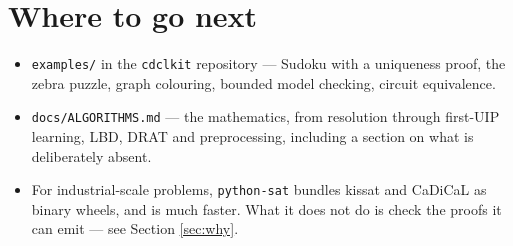 \documentclass[11pt,a4paper]{article}
\newcommand{\pkg}[1]{\texttt{#1}}
\begin{document}
\section*{Where to go next}

\begin{itemize}
\item \texttt{examples/} in the \pkg{cdclkit} repository --- Sudoku with a
      uniqueness proof, the zebra puzzle, graph colouring, bounded model
      checking, circuit equivalence.
\item \texttt{docs/ALGORITHMS.md} --- the mathematics, from resolution through
      first-UIP learning, LBD, DRAT and preprocessing, including a section on
      what is deliberately absent.
\item For industrial-scale problems, \pkg{python-sat} bundles kissat and
      CaDiCaL as binary wheels, and is much faster. What it does not do is
      check the proofs it can emit --- see Section \ref{sec:why}.
\end{itemize}
\end{document}
